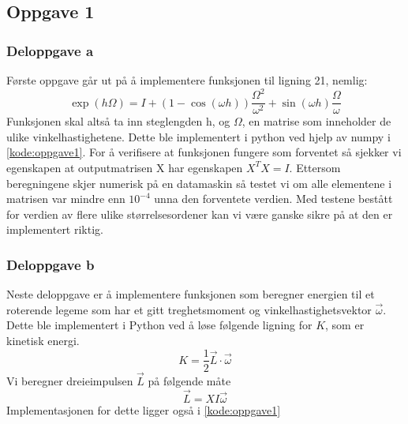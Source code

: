 \subsection{Oppgave 1}
\subsubsection{Deloppgave a}
Første oppgave går ut på å implementere funksjonen til ligning 21, nemlig: 
\begin{equation}
    \exp(h\Omega) = \textit{I} + (1 - \cos(\omega h))\frac{\Omega^2}{\omega^2}+\sin(\omega h)\frac{\Omega}{\omega}
\end{equation}
Funksjonen skal altså ta inn steglengden h, og $\Omega$, en matrise som inneholder de ulike vinkelhastighetene. Dette ble implementert i python ved hjelp av numpy i \ref{kode:oppgave1}. For å verifisere at funksjonen fungere som forventet så sjekker vi egenskapen at outputmatrisen X har egenskapen $X^T X = I$. Ettersom beregningene skjer numerisk på en datamaskin så testet vi om alle elementene i matrisen var mindre enn $10^{-4}$ unna den forventete verdien. Med testene bestått for verdien av flere ulike størrelsesordener kan vi være ganske sikre på at den er implementert riktig.
\subsubsection{Deloppgave b}
Neste deloppgave er å implementere funksjonen som beregner energien til et roterende legeme som har et gitt treghetsmoment og vinkelhastighetsvektor $\Vec{\omega}$. Dette ble implementert i Python ved å løse følgende ligning for $K$, som er kinetisk energi.
\begin{equation}
    \textit{K} = \frac{1}{2}\vec{\textit{L}}\cdot \vec{\omega}
\end{equation}
Vi beregner dreieimpulsen $\vec{L}$ på følgende måte
\begin{equation}
\label{eq:dreieimpuls}
    \vec{L}=XI\vec{\omega}
\end{equation}
Implementasjonen for dette ligger også i \ref{kode:oppgave1}
